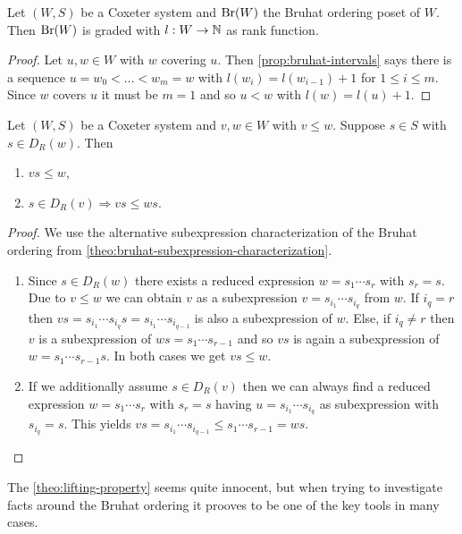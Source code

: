 \begin{coro}
	Let $(W,S)$ be a Coxeter system and $\operatorname{Br}(W)$ the Bruhat ordering poset of $W$. Then $\operatorname{Br}(W)$ is graded with $l:W \to \mathbb{N}$ as rank function.

	\begin{proof}
		Let $u,w \in W$ with $w$ covering $u$. Then \ref{prop:bruhat-intervals} says there is a sequence $u = w_0 < \ldots < w_m = w$ with $l(w_i) = l(w_{i-1}) + 1$ for $1 \leq i \leq m$. Since $w$ covers $u$ it must be $m = 1$ and so $u < w$ with $l(w) = l(u) + 1$.
	\end{proof}
\end{coro}

\begin{theo}
	Let $(W,S)$ be a Coxeter system and $v,w \in W$ with $v \leq w$. Suppose $s \in S$ with $s \in D_R(w)$. Then
	\begin{enumerate}
		\item $vs \leq w$,
		\item $s \in D_R(v) \Rightarrow vs \leq ws$.
	\end{enumerate}

	\begin{proof}
		We use the alternative subexpression characterization of the Bruhat ordering from \ref{theo:bruhat-subexpression-characterization}.
		\begin{enumerate}
			\item Since $s \in D_R(w)$ there exists a reduced expression $w = s_1 \cdots s_r$ with $s_r = s$. Due to $v \leq w$ we can obtain $v$ as a subexpression $v = s_{i_1} \cdots s_{i_q}$ from $w$. If $i_q = r$ then $vs = s_{i_1} \cdots s_{i_q} s = s_{i_1} \cdots s_{i_{q - 1}}$ is also a subexpression of $w$. Else, if $i_q \neq r$ then $v$ is a subexpression of $ws = s_1 \cdots s_{r-1}$ and so $vs$ is again a subexpression of $w = s_1 \cdots s_{r-1} s$. In both cases we get $vs \leq w$.
			\item If we additionally assume $s \in D_R(v)$ then we can always find a reduced expression $w = s_1 \cdots s_r$ with $s_r = s$ having $u = s_{i_1} \cdots s_{i_q}$ as subexpression with $s_{i_q} = s$. This yields $vs = s_{i_1} \cdots s_{i_{q-1}} \leq s_1 \cdots s_{r-1} = ws$. \qedhere
		\end{enumerate}
	\end{proof}
\end{theo}

The \ref{theo:lifting-property} seems quite innocent, but when trying to investigate facts around the Bruhat ordering it prooves to be one of the key tools in many cases.